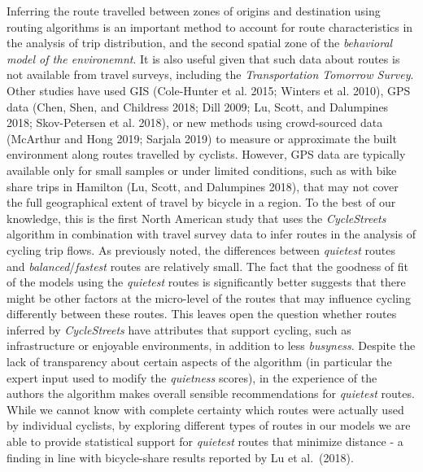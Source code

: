 \documentclass[smallextended]{svjour3}       %
\begin{document}
Inferring the route travelled between zones of origins and destination
using routing algorithms is an important method to account for route
characteristics in the analysis of trip distribution, and the second
spatial zone of the \emph{behavioral model of the environemnt}. It is
also useful given that such data about routes is not available from
travel surveys, including the \emph{Transportation Tomorrow Survey}.
Other studies have used GIS (Cole-Hunter et al. 2015; Winters et al.
2010), GPS data (Chen, Shen, and Childress 2018; Dill 2009; Lu, Scott,
and Dalumpines 2018; Skov-Petersen et al. 2018), or new methods using
crowd-sourced data (McArthur and Hong 2019; Sarjala 2019) to measure or
approximate the built environment along routes travelled by cyclists.
However, GPS data are typically available only for small samples or
under limited conditions, such as with bike share trips in Hamilton (Lu,
Scott, and Dalumpines 2018), that may not cover the full geographical
extent of travel by bicycle in a region. To the best of our knowledge,
this is the first North American study that uses the \emph{CycleStreets}
algorithm in combination with travel survey data to infer routes in the
analysis of cycling trip flows. As previously noted, the differences
between \emph{quietest} routes and \emph{balanced}/\emph{fastest} routes
are relatively small. The fact that the goodness of fit of the models
using the \emph{quietest} routes is significantly better suggests that
there might be other factors at the micro-level of the routes that may
influence cycling differently between these routes. This leaves open the
question whether routes inferred by \emph{CycleStreets} have attributes
that support cycling, such as infrastructure or enjoyable environments,
in addition to less \emph{busyness}. Despite the lack of transparency
about certain aspects of the algorithm (in particular the expert input
used to modify the \emph{quietness} scores), in the experience of the
authors the algorithm makes overall sensible recommendations for
\emph{quietest} routes. While we cannot know with complete certainty
which routes were actually used by individual cyclists, by exploring
different types of routes in our models we are able to provide
statistical support for \emph{quietest} routes that minimize distance -
a finding in line with bicycle-share results reported by Lu et
al.~(2018).
\end{document}
